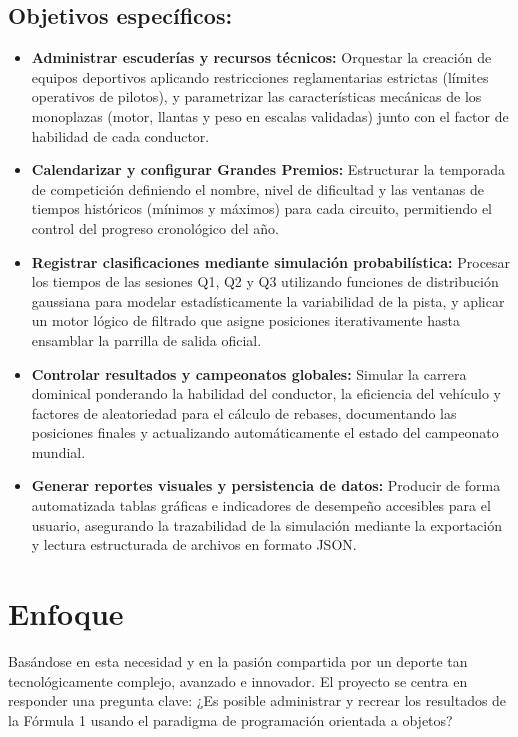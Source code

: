 \documentclass[12pt,a4paper]{article}
\begin{document}
\subsection*{Objetivos específicos:}
\begin{itemize}
    \item \textbf{Administrar escuderías y recursos técnicos:} Orquestar la creación de equipos deportivos aplicando restricciones reglamentarias estrictas (límites operativos de pilotos), y parametrizar las características mecánicas de los monoplazas (motor, llantas y peso en escalas validadas) junto con el factor de habilidad de cada conductor.
    
    \item \textbf{Calendarizar y configurar Grandes Premios:} Estructurar la temporada de competición definiendo el nombre, nivel de dificultad y las ventanas de tiempos históricos (mínimos y máximos) para cada circuito, permitiendo el control del progreso cronológico del año.
    
    \item \textbf{Registrar clasificaciones mediante simulación probabilística:} Procesar los tiempos de las sesiones Q1, Q2 y Q3 utilizando funciones de distribución gaussiana para modelar estadísticamente la variabilidad de la pista, y aplicar un motor lógico de filtrado que asigne posiciones iterativamente hasta ensamblar la parrilla de salida oficial.
    
    \item \textbf{Controlar resultados y campeonatos globales:} Simular la carrera dominical ponderando la habilidad del conductor, la eficiencia del vehículo y factores de aleatoriedad para el cálculo de rebases, documentando las posiciones finales y actualizando automáticamente el estado del campeonato mundial.
    
    \item \textbf{Generar reportes visuales y persistencia de datos:} Producir de forma automatizada tablas gráficas e indicadores de desempeño accesibles para el usuario, asegurando la trazabilidad de la simulación mediante la exportación y lectura estructurada de archivos en formato JSON.
\end{itemize}

\section{Enfoque}
Basándose en esta necesidad y en la pasión compartida por un deporte tan tecnológicamente complejo, avanzado e innovador. El proyecto se centra en responder una pregunta clave: ¿Es posible administrar y recrear los resultados de la Fórmula 1 usando el paradigma de programación orientada a objetos?
\end{document}
